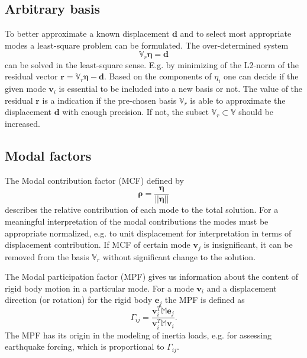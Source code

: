 \documentclass[conference]{journal}
\newcommand{\bb}[1]{\mathbb{#1}}
\newcommand{\B}[1]{\mathbf{#1}}
\newcommand{\Bv}{\B{v}}
\newcommand{\Beta}{\boldsymbol{\eta}}
\newcommand{\Brho}{\boldsymbol{\rho}}
\begin{document}
	\subsection{Arbitrary basis}
	To better approximate a known displacement $\B{d}$ and to select most appropriate modes a least-square problem can be formulated. The over-determined system 
	\begin{equation}
	\bb{V}_r \Beta = \B{d}
	\end{equation}
	can be solved in the least-square sense. E.g. by minimizing of the L2-norm of the residual vector $\B{r} = \bb{V}_r \Beta - \B{d}$. Based on the components of $\eta_i$ one can decide if the given mode $\Bv_i$ is essential to be included into a new basis or not. The value of the residual $\B{r}$ is a indication if the pre-chosen basis $\bb{V}_r$ is able to approximate the displacement $\B{d}$ with enough precision. If not, the subset $\bb{V}_r \subset \bb{V}$ should be increased.
	
	\subsection{Modal factors}
	The Modal contribution factor (MCF) defined by
	\begin{equation} \label{eq:3MCF}
	\Brho = \frac{\Beta}{|| \Beta ||}
	\end{equation}
	describes the relative contribution of each mode to the total solution. For a meaningful interpretation of the modal contributions the modes must be appropriate normalized, e.g. to unit displacement for interpretation in terms of displacement contribution.	If MCF of certain mode $\Bv_j$ is insignificant, it can be removed from the basis $\bb{V}_r$ without significant change to the solution.
	
	The Modal participation factor (MPF) gives us information about the content of rigid body motion in a particular mode. For a mode $\Bv_i$ and a displacement direction (or rotation) for the rigid body $\B{e}_j$ the MPF is defined as
	\begin{equation} \label{eq:3MPF}
	\Gamma_{ij} = \frac{\Bv_i^T \bb{M} \B{e}_j}{\Bv_i^T \bb{M} \Bv_i}.
	\end{equation}
	The MPF has its origin in the modeling of inertia loads, e.g. for assessing earthquake forcing, which is proportional to $\Gamma_{ij}$.
	
	
\end{document}
